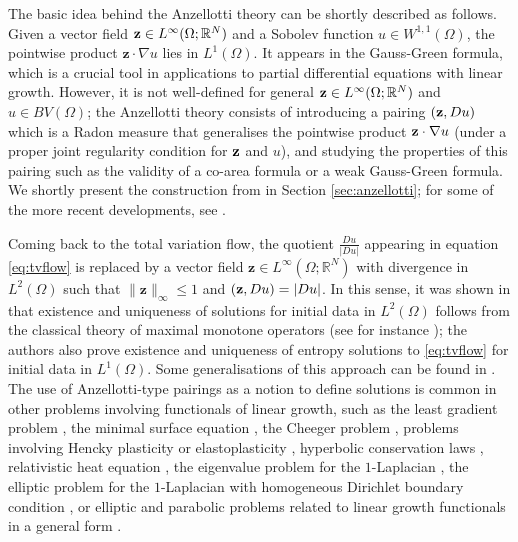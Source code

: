 \documentclass[reqno,12pt]{amsart}
\def\z{{\bf z}}
\numberwithin{equation}{section}
\begin{document}
The basic idea behind the Anzellotti theory can be shortly described as follows. Given a vector field $\z \in L^\infty(\Omega; \mathbb{R}^N)$ and a Sobolev function $u \in W^{1,1}(\Omega)$, the pointwise product $\mathbf{z} \cdot \nabla u$ lies in $L^1(\Omega)$. It appears in the Gauss-Green formula, which is a crucial tool in applications to partial differential equations with linear growth. However, it is not well-defined for general $\z \in L^\infty(\Omega; \mathbb{R}^N)$ and $u \in BV(\Omega)$; the Anzellotti theory consists of introducing a pairing $(\z, Du)$ which is a Radon measure that generalises the pointwise product $\z \cdot \nabla u$ (under a proper joint regularity condition for $\z$ and $u$), and studying the properties of this pairing such as the validity of a co-area formula or a weak Gauss-Green formula. We shortly present the construction from \cite{Anzellotti} in Section \ref{sec:anzellotti}; for some of the more recent developments, see \cite{CF,CCT,CdC}.

Coming back to the total variation flow, the quotient $\frac{Du}{|Du|}$ appearing in equation \eqref{eq:tvflow} is replaced by a vector field $\mathbf{z} \in L^\infty(\Omega; \mathbb{R}^N)$ with divergence in $L^2(\Omega)$ such that $\| \mathbf{z} \|_\infty \leq 1$ and $(\z, Du) = |Du|$. In this sense, it was shown in \cite{ACMBook} that existence and uniqueness of solutions for initial data in $L^2(\Omega)$ follows from the classical theory of maximal monotone operators (see for instance \cite{Brezis}); the authors also prove existence and uniqueness of entropy solutions to \eqref{eq:tvflow} for initial data in $L^1(\Omega)$. Some generalisations of this approach can be found in \cite{GM2021-1,Moll}. The use of Anzellotti-type pairings as a notion to define solutions is common in other problems involving functionals of linear growth, such as the least gradient problem \cite{MRL}, the minimal surface equation \cite{SS}, the Cheeger problem \cite{ACC,CFM}, problems involving Hencky plasticity or elastoplasticity \cite{FG,KT}, hyperbolic conservation laws \cite{CF}, relativistic heat equation \cite{ACMM}, the eigenvalue problem for the $1$-Laplacian \cite{BCN}, the elliptic problem for the $1$-Laplacian with homogeneous Dirichlet boundary condition \cite{Dem,MST}, or elliptic and parabolic problems related to linear growth functionals in a general form \cite{BS,GM2022}.
\end{document}
